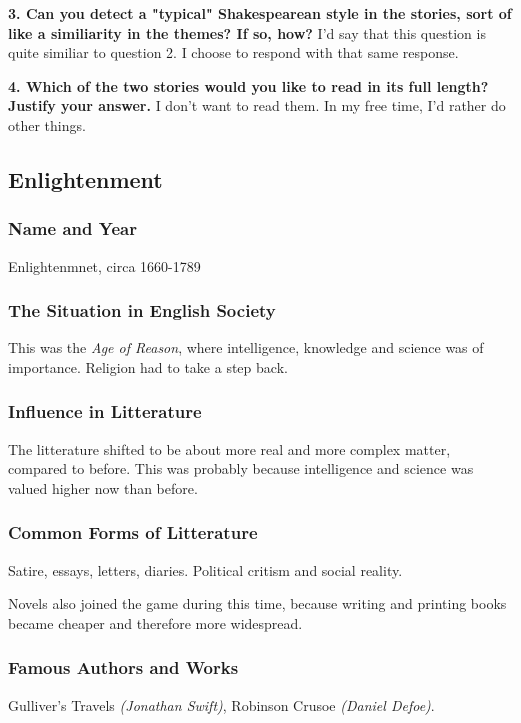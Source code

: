 \textbf{3. Can you detect a "typical" Shakespearean style in the stories, sort of like a similiarity in the themes? If so, how?}
I'd say that this question is quite similiar to question 2. I choose to respond with that same response.

\textbf{4. Which of the two stories would you like to read in its full length? Justify your answer.}
I don't want to read them. In my free time, I'd rather do other things.

\newpage
\subsection{Enlightenment}

\subsubsection{Name and Year}
Enlightenmnet, circa 1660-1789

\subsubsection{The Situation in English Society}
This was the \textit{Age of Reason}, where intelligence, knowledge and science was of importance. Religion had to take a step back.

\subsubsection{Influence in Litterature}
The litterature shifted to be about more real and more complex matter, compared to before. This was probably because intelligence and science was valued higher now than before.

\subsubsection{Common Forms of Litterature}
Satire, essays, letters, diaries. Political critism and social reality.

Novels also joined the game during this time, because writing and printing books became cheaper and therefore more widespread.

\subsubsection{Famous Authors and Works}
Gulliver's Travels \textit{(Jonathan Swift)}, Robinson Crusoe \textit{(Daniel Defoe)}.

